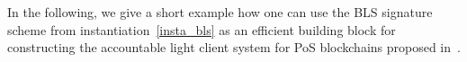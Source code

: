 \vspace{-0.01in}
\noindent In the following, we give a short example how one can use the BLS signature scheme from instantiation~\ref{insta_bls} as an 
efficient building block for constructing the accountable light client system for PoS blockchains proposed in~\cite{ourLC}. 